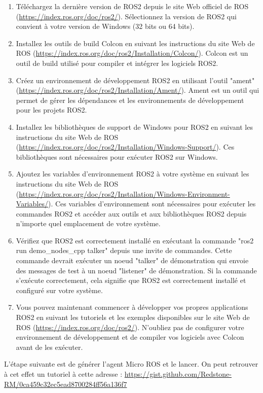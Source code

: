  \begin{enumerate}
	\item Téléchargez la dernière version de ROS2 depuis le site Web officiel de ROS (\url{https://index.ros.org/doc/ros2/}). 
	Sélectionnez la version de ROS2 qui convient à votre version de Windows (32 bits ou 64 bits). 

	\item Installez les outils de build Colcon en suivant les instructions du site Web de ROS 
	(\url{https://index.ros.org/doc/ros2/Installation/Colcon/}).
	Colcon est un outil de build utilisé pour compiler et intégrer les logiciels ROS2. 

	\item Créez un environnement de développement ROS2 en utilisant l'outil "ament" 
	(\url{https://index.ros.org/doc/ros2/Installation/Ament/}).
	Ament est un outil qui permet de gérer les dépendances et les environnements de développement pour les projets ROS2. 

	\item Installez les bibliothèques de support de Windows pour ROS2 en suivant les instructions du site Web de ROS 
	(\url{https://index.ros.org/doc/ros2/Installation/Windows-Support/}).
	Ces bibliothèques sont nécessaires pour exécuter ROS2 sur Windows. 

	\item Ajoutez les variables d'environnement ROS2 à votre système en suivant les instructions du site Web de ROS 
	(\url{https://index.ros.org/doc/ros2/Installation/Windows-Environment-Variables/}).
	Ces variables d'environnement sont nécessaires pour exécuter les commandes ROS2 et accéder aux outils et aux bibliothèques ROS2 
	depuis n'importe quel emplacement de votre système. 

	\item Vérifiez que ROS2 est correctement installé en exécutant la commande "ros2 run demo\_nodes\_cpp talker" depuis une 
	invite de commandes.
	Cette commande devrait exécuter un noeud "talker" de démonstration qui envoie des messages de test à un noeud "listener" de démonstration.
	Si la commande s'exécute correctement, cela signifie que ROS2 est correctement installé et configuré sur votre système.

	\item Vous pouvez maintenant commencer à développer vos propres applications ROS2 en suivant les tutoriels et les exemples disponibles 
	sur le site Web de ROS (\url{https://index.ros.org/doc/ros2/}).
	N'oubliez pas de configurer votre environnement de développement et de compiler vos logiciels avec Colcon avant de les exécuter.
\end{enumerate}

L'étape suivante est de générer l'agent Micro ROS et le lancer. On peut retrouver à cet effet un tutoriel à cette adresse :
\url{https://gist.github.com/Redstone-RM/0ca459c32ec5ead8700284ff56a136f7}
\linebreak

\clearemptydoublepage

